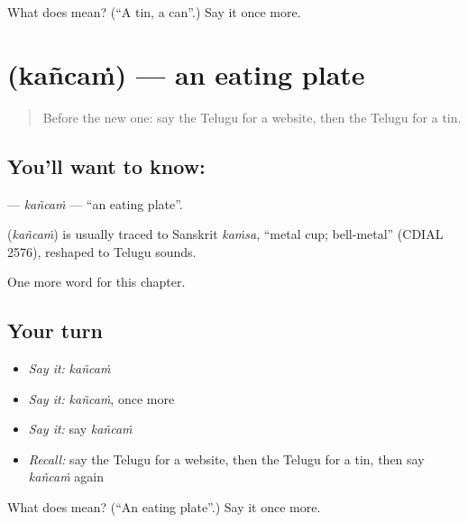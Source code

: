 \begin{tcolorbox}[breakable,colback=teal!4,colframe=teal!35!black,title={Before you move on}]
What does  mean? (\textquotedblleft{}A tin, a can\textquotedblright{}.) Say it once more.
\end{tcolorbox}
\section[\texorpdfstring{\te{కంచం} (kañcaṁ)}{కంచం (kañcaṁ)}]{ (kañcaṁ) — an eating plate}

\label{lesson:TE-C269-kancam}



\begin{quote}
Before the new one: say the Telugu for a website, then the Telugu for a tin.
\end{quote}

\subsection*{You'll want to know: }
\textbf{} — \emph{kañcaṁ} — \textquotedblleft{}an eating plate\textquotedblright{}.

\begin{cousinweb}
\textbf{} (\emph{kañcaṁ}) is usually traced to Sanskrit \emph{kaṁsa}, \textquotedblleft{}metal cup; bell-metal\textquotedblright{} (CDIAL 2576), reshaped to Telugu sounds.
\end{cousinweb}

\begin{grammarlens}[title={What you've built}]
One more word for this chapter.
\end{grammarlens}

\subsection*{Your turn}
\begin{itemize}
\raggedright
  \item \emph{Say it:} \emph{kañcaṁ}
  \item \emph{Say it:} \emph{kañcaṁ}, once more
  \item \emph{Say it:} say \emph{kañcaṁ}
  \item \emph{Recall:} say the Telugu for a website, then the Telugu for a tin, then say \emph{kañcaṁ} again
\end{itemize}

\begin{tcolorbox}[breakable,colback=teal!4,colframe=teal!35!black,title={Before you move on}]
What does  mean? (\textquotedblleft{}An eating plate\textquotedblright{}.) Say it once more.
\end{tcolorbox}
